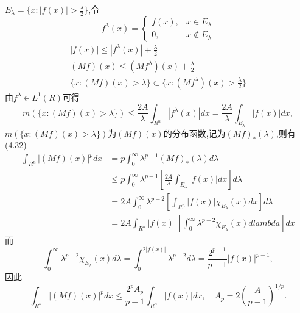 \documentclass[12pt,a4paper,openany]{book}
\begin{document}
\begin{enumerate}
$E_{\lambda} = \{x : |f(x)|>\frac{\lambda}{2}\}$,令
\[
f^{\lambda}(x)=\begin{cases}
f(x),&x \in E_{\lambda} \\
0,&x \notin E_{\lambda}
\end{cases}
\]
\begin{gather*}
|f(x)| \le |f^{\lambda}(x)| + \frac{\lambda}{2} \\
(Mf)(x) \le (Mf^{\lambda})(x) + \frac{\lambda}{2} \\
\{x: (Mf)(x) > \lambda\} \subset \{x : (Mf^{\lambda})(x) > \frac{\lambda}{2}\}
\end{gather*}
由$f^{\lambda} \in L^1(R)$可得
\[
m(\{x:(Mf)(x) > \lambda\}) \le \frac{2A}{\lambda}\int_{R^n}{|f^{\lambda}(x)|dx}=\frac{2A}{\lambda}\int_{E_{\lambda}}{|f(x)|dx},
\]
$m(\{x:(Mf)(x)>\lambda\})$为$(Mf)(x)$的分布函数,记为$(Mf)_*(\lambda)$,则有(4.32)
\[
\begin{aligned}
\int_{R^n}{|(Mf)(x)|^pdx} &= p\int_{0}^{\infty}{\lambda^{p-1}(Mf)_*(\lambda)d\lambda} \\
&\le p\int_{0}^{\infty}{\lambda^{p-1}[\frac{2A}{\lambda}\int_{E_{\lambda}}{|f(x)|dx}]d\lambda}\\
&=2A\int_{0}^{\infty}{\lambda^{p-2}[\int_{R^n}{|f(x)|\chi_{E_{\lambda}}(x)dx}]d\lambda} \\
&=2A\int_{R^n}{|f(x)|[\int_{0}^{\infty}{\lambda^{p-2}\chi_{E_{\lambda}}(x)dlambda}]dx}
\end{aligned}
\]
而
\[
\int_{0}^{\infty}{\lambda^{p-2}\chi_{E_{\lambda}}(x)d\lambda} = \int_{0}^{2|f(x)|}{\lambda^{p-2}d\lambda}=\frac{2^{p-1}}{p-1}|f(x)|^{p-1},
\]
因此
\[
\int_{R^n}{|(Mf)(x)|^pdx} \le \frac{2^pA_p}{p-1}\int_{R^n}{|f(x)|dx}, \quad A_p=2(\frac{A}{p-1})^{1/p}.
\]

\end{enumerate}
\end{document}
